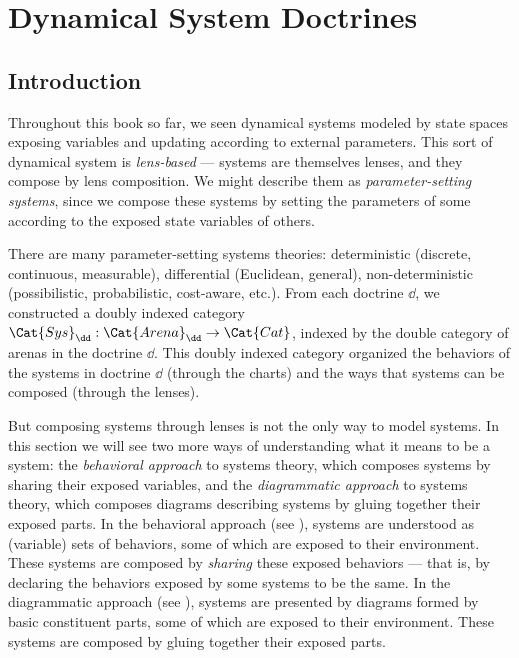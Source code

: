 \documentclass[DynamicalBook]{subfiles}
\begin{document}
%


\setcounter{chapter}{5}%

\chapter{Dynamical System Doctrines}\label{chapter.6}

\section{Introduction}


Throughout this book so far, we seen dynamical systems modeled by state spaces exposing
variables and updating according to external parameters. This sort of dynamical
system is \emph{lens-based} --- systems are themselves lenses, and they compose by
lens composition. We might describe them as \emph{parameter-setting systems},
since we compose these systems by setting the parameters of some according to
the exposed state variables of others.

There are many parameter-setting systems theories: deterministic (discrete, continuous, measurable), differential (Euclidean, general), non-deterministic (possibilistic, probabilistic, cost-aware, etc.). From each doctrine $\dd$, we constructed a doubly indexed category $\Cat{Sys}_{\dd} : \Cat{Arena}_{\dd} \to \Cat{Cat}$, indexed by the double category of arenas in the doctrine $\dd$. This doubly indexed category organized the behaviors of the systems in doctrine $\dd$ (through the charts) and the ways that systems can be composed (through the lenses).

But composing systems through lenses is not the only way to model systems. In this section we will see two more ways of understanding what it means to be a system: the \emph{behavioral approach} to systems theory, which composes systems by sharing their exposed variables, and the \emph{diagrammatic approach} to systems theory, which composes diagrams describing systems by gluing together their exposed parts. In the behavioral approach (see \cite{sec:behavioral.approach}), systems are understood as (variable) sets of behaviors, some of which are exposed to their environment. These systems are composed by \emph{sharing} these exposed behaviors --- that is, by declaring the behaviors exposed by some systems to be the same. In the diagrammatic approach (see \cite{sec:diagram.approach}), systems are presented by diagrams formed by basic constituent parts, some of which are exposed to their environment. These systems are composed by gluing together their exposed parts.
\end{document}
